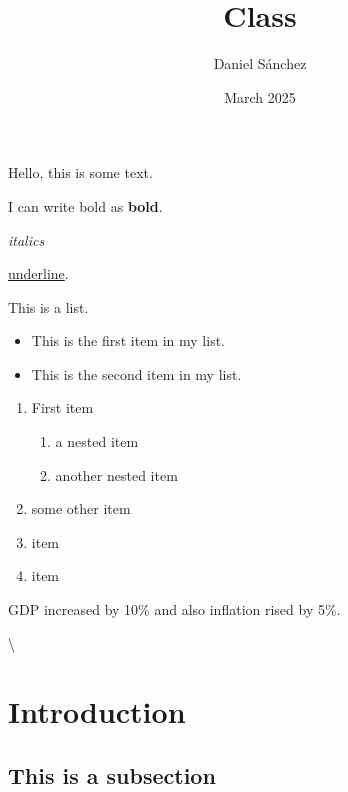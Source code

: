\documentclass[12pt]{article} %
\title{Class} %
\author{Daniel Sánchez}
\date{March 2025}
\begin{document}

\maketitle %

\tableofcontents

Hello, this is some text.

I can write bold as \textbf{bold}. 

\textit{italics}

\underline{underline}.

This is a list. 

\begin{itemize}
    \item  This is the first item in my list.
    \item This is the second item in my list.
\end{itemize}

\begin{enumerate}
    \item First item
    \begin{enumerate}
        \item a nested item 
        \item another nested item
    \end{enumerate}
    \item some other item
    \item item
    \item item 
\end{enumerate}

\noindent \lipsum[1]

\vspace{0.5cm}

\lipsum[2]


GDP increased by 10\% and also inflation rised by 5\%.

\textbackslash

\section{Introduction}

\lipsum 

\subsection{This is a subsection}
\end{document}
